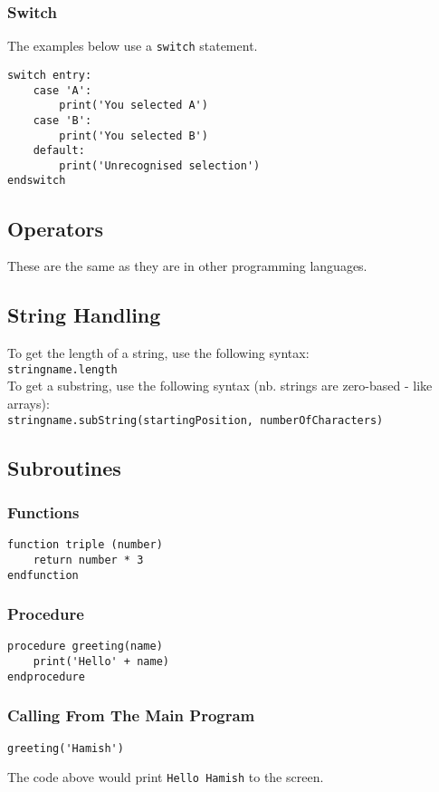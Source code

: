 \documentclass[a4paper,11pt]{article}
\begin{document}
\subsubsection{Switch}
The examples below use a \verb|switch| statement.
\begin{Verbatim}[breaklines=true, breakanywhere=true]
switch entry:
    case 'A':
        print('You selected A')
    case 'B':
        print('You selected B')
    default:
        print('Unrecognised selection')
endswitch
\end{Verbatim}
\subsection{Operators}
These are the same as they are in other programming languages.
\subsection{String Handling}
To get the length of a string, use the following syntax:\\
\verb|stringname.length|\\
To get a substring, use the following syntax (nb. strings are zero-based - like arrays):\\
\verb|stringname.subString(startingPosition, numberOfCharacters)|
\subsection{Subroutines}
\subsubsection{Functions}
\begin{Verbatim}[breaklines=true, breakanywhere=true]
function triple (number)
    return number * 3
endfunction
\end{Verbatim}
\subsubsection{Procedure}
\begin{Verbatim}[breaklines=true, breakanywhere=true]
procedure greeting(name)
    print('Hello' + name)
endprocedure
\end{Verbatim}
\subsubsection{Calling From The Main Program}
\begin{Verbatim}[breaklines=true, breakanywhere=true]
greeting('Hamish')
\end{Verbatim}
The code above would print \verb|Hello Hamish| to the screen. 
\end{document}
